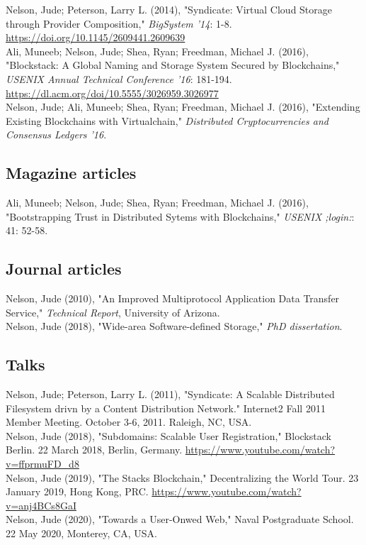 \documentclass[11pt]{article} %
\begin{document}
Nelson, Jude; Peterson, Larry L. (2014), "Syndicate: Virtual Cloud Storage through Provider Composition," \emph{BigSystem '14}: 1-8. \url{https://doi.org/10.1145/2609441.2609639}\\
Ali, Muneeb; Nelson, Jude; Shea, Ryan; Freedman, Michael J. (2016), "Blockstack: A Global Naming and Storage System Secured by Blockchains," \emph{USENIX Annual Technical Conference '16}: 181-194. \url{https://dl.acm.org/doi/10.5555/3026959.3026977}\\
Nelson, Jude; Ali, Muneeb; Shea, Ryan; Freedman, Michael J. (2016),
"Extending Existing Blockchains with Virtualchain," \emph{Distributed
Cryptocurrencies and Consensus Ledgers '16}.\\

\subsection*{Magazine articles}

Ali, Muneeb; Nelson, Jude; Shea, Ryan; Freedman, Michael J. (2016),
"Bootstrapping Trust in Distributed Sytems with Blockchains," \emph{USENIX
;login:}: 41: 52-58.\\

\subsection*{Journal articles}

Nelson, Jude (2010), "An Improved Multiprotocol Application Data
Transfer Service," \emph{Technical Report}, University of Arizona.\\
Nelson, Jude (2018), "Wide-area Software-defined Storage," \emph{PhD dissertation}.\\

\subsection*{Talks}

Nelson, Jude; Peterson, Larry L. (2011), "Syndicate: A Scalable
Distributed Filesystem drivn by a Content Distribution Network." Internet2 Fall
2011 Member Meeting.  October 3-6, 2011. Raleigh, NC, USA.\\
Nelson, Jude (2018), "Subdomains: Scalable User Registration,"
Blockstack Berlin.  22 March 2018, Berlin, Germany. \url{https://www.youtube.com/watch?v=ffprmuFD_d8}\\
Nelson, Jude (2019), "The Stacks Blockchain," Decentralizing the
World Tour.  23 January 2019, Hong Kong, PRC. \url{https://www.youtube.com/watch?v=anj4BCs8GaI}\\
Nelson, Jude (2020), "Towards a User-Onwed Web," Naval Postgraduate
School.  22 May 2020, Monterey, CA, USA.
\end{document}
